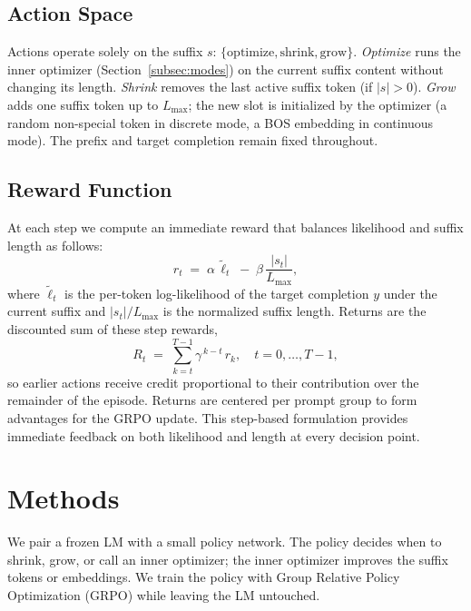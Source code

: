 \documentclass[11pt]{article}
\begin{document}
\subsection{Action Space}
\label{subsec:actions}

Actions operate solely on the suffix \(s\): \(\{\text{optimize}, \text{shrink}, \text{grow}\}\). \emph{Optimize} runs the inner optimizer (Section~\ref{subsec:modes}) on the current suffix content without changing its length. \emph{Shrink} removes the last active suffix token (if \(|s|>0\)). \emph{Grow} adds one suffix token up to \(L_{\max}\); the new slot is initialized by the optimizer (a random non-special token in discrete mode, a BOS embedding in continuous mode). The prefix and target completion remain fixed throughout.

\subsection{Reward Function}
\label{subsec:reward}

At each step we compute an immediate reward that balances likelihood and suffix length as follows:
\begin{equation}
  r_t \;=\; \alpha\,\tilde{\ell}_t \;-\; \beta\,\frac{|s_t|}{L_{\max}},
\end{equation}
where \(\tilde{\ell}_t\) is the per-token log-likelihood of the target completion \(y\) under the current suffix and \(|s_t|/L_{\max}\) is the normalized suffix length. Returns are the discounted sum of these step rewards,
\begin{equation}
  R_t \;=\; \sum_{k=t}^{T-1} \gamma^{\,k-t}\, r_k,\quad t = 0,\dots,T-1,
\end{equation}
so earlier actions receive credit proportional to their contribution over the remainder of the episode. Returns are centered per prompt group to form advantages for the GRPO update. This step-based formulation provides immediate feedback on both likelihood and length at every decision point.


\section{Methods}
\label{sec:method}

We pair a frozen LM with a small policy network. The policy decides when to shrink, grow, or call an inner optimizer; the inner optimizer improves the suffix tokens or embeddings. We train the policy with Group Relative Policy Optimization (GRPO) \citep{shao2024deepseekmath} while leaving the LM untouched.
\end{document}
